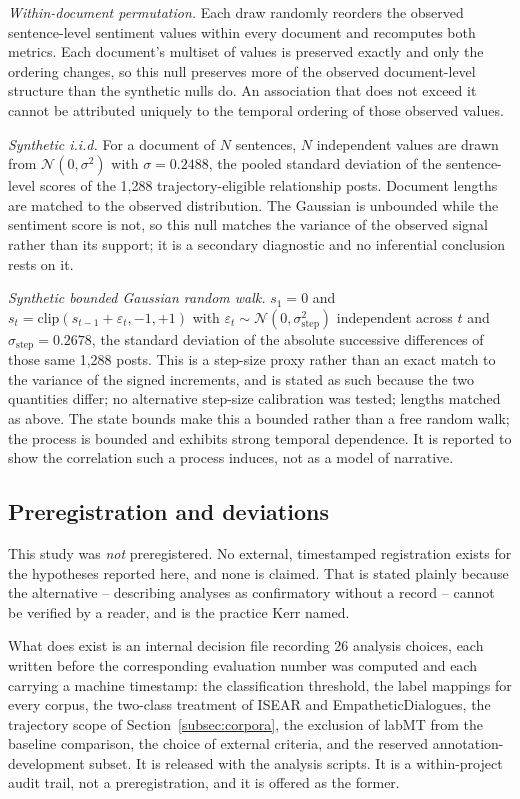 \documentclass[fleqn,10pt]{wlscirep}
\begin{document}
\emph{Within-document permutation.} Each draw randomly reorders the observed sentence-level sentiment values within every document and recomputes both metrics. Each document's multiset of values is preserved exactly and only the ordering changes, so this null preserves more of the observed document-level structure than the synthetic nulls do. An association that does not exceed it cannot be attributed uniquely to the temporal ordering of those observed values.

\emph{Synthetic i.i.d.} For a document of $N$ sentences, $N$ independent values are drawn from $\mathcal{N}(0, \sigma^2)$ with $\sigma = 0.2488$, the pooled standard deviation of the sentence-level scores of the 1{,}288 trajectory-eligible relationship posts. Document lengths are matched to the observed distribution. The Gaussian is unbounded while the sentiment score is not, so this null matches the variance of the observed signal rather than its support; it is a secondary diagnostic and no inferential conclusion rests on it.

\emph{Synthetic bounded Gaussian random walk.} $s_1 = 0$ and $s_t = \mathrm{clip}(s_{t-1} + \varepsilon_t, -1, +1)$ with $\varepsilon_t \sim \mathcal{N}(0, \sigma_{\mathrm{step}}^2)$ independent across $t$ and $\sigma_{\mathrm{step}} = 0.2678$, the standard deviation of the absolute successive differences of those same 1{,}288 posts. This is a step-size proxy rather than an exact match to the variance of the signed increments, and is stated as such because the two quantities differ; no alternative step-size calibration was tested; lengths matched as above. The state bounds make this a bounded rather than a free random walk; the process is bounded and exhibits strong temporal dependence. It is reported to show the correlation such a process induces, not as a model of narrative.

\subsection{Preregistration and deviations}\label{subsec:prereg}

This study was \emph{not} preregistered. No external, timestamped registration exists for the hypotheses reported here, and none is claimed. That is stated plainly because the alternative -- describing analyses as confirmatory without a record -- cannot be verified by a reader, and is the practice Kerr\cite{kerr1998} named.

What does exist is an internal decision file recording 26 analysis choices, each written before the corresponding evaluation number was computed and each carrying a machine timestamp: the classification threshold, the label mappings for every corpus, the two-class treatment of ISEAR and EmpatheticDialogues, the trajectory scope of Section~\ref{subsec:corpora}, the exclusion of labMT from the baseline comparison, the choice of external criteria, and the reserved annotation-development subset. It is released with the analysis scripts. It is a within-project audit trail, not a preregistration, and it is offered as the former.
\end{document}
